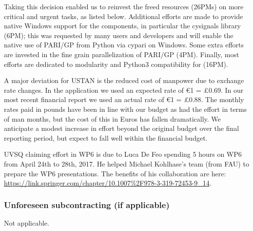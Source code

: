 Taking this decision enabled us to reinvest the freed resources
(26PMs) on more critical and urgent tasks, as listed below. Additional
efforts are made to provide native Windows support for the \ODK
components, in particular the cysignals library (6PM); this was
requested by many users and developers and will enable the native use
of PARI/GP from Python via cypari on Windows. Some extra efforts are
invested in the fine grain parallelization of PARI/GP (4PM). Finally,
most efforts are dedicated to modularity and Python3 compatibility for
\Sage (16PM).


A major deviation for USTAN is the reduced cost of manpower due to exchange rate changes. In the application
we used an expected rate of \euro 1 = \pounds 0.69. In our most recent financial report we used an actual
rate of \euro 1 = \pounds 0.88. The monthly rates paid in pounds have been in line with our budget as had the 
effort in terms of man months, but the cost of this in Euros has fallen dramatically. We anticipate a modest increase in 
effort beyond the original budget over the final reporting period, but expect to fall well within the financial budget.

UVSQ claiming effort in WP6 is due to Luca De Feo spending 5 hours on WP6 from April 24th to 28th, 2017. He helped Michael 
Kohlhase's team (from FAU) to prepare the WP6 presentations. The benefits of his collaboration are here:
\url{https://link.springer.com/chapter/10.1007%2F978-3-319-72453-9_14}.

\subsubsection{Unforeseen subcontracting (if applicable)}

Not applicable.

